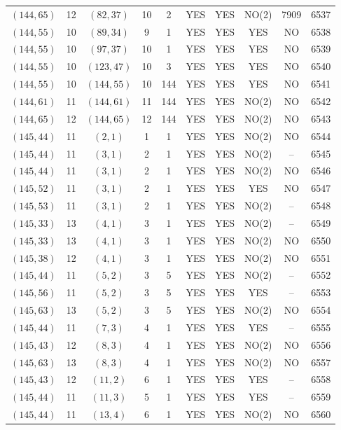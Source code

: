 \begin{longtable}{|c|c|c|c|c|c|c|c|c|c|}
$(144, 65)$ & 12 & $(82, 37)$ & 10 & 2 & YES & YES & NO(2) & 7909 & 6537\\
$(144, 55)$ & 10 & $(89, 34)$ & 9 & 1 & YES & YES & YES & NO & 6538\\
$(144, 55)$ & 10 & $(97, 37)$ & 10 & 1 & YES & YES & YES & NO & 6539\\
$(144, 55)$ & 10 & $(123, 47)$ & 10 & 3 & YES & YES & YES & NO & 6540\\
$(144, 55)$ & 10 & $(144, 55)$ & 10 & 144 & YES & YES & YES & NO & 6541\\
$(144, 61)$ & 11 & $(144, 61)$ & 11 & 144 & YES & YES & NO(2) & NO & 6542\\
$(144, 65)$ & 12 & $(144, 65)$ & 12 & 144 & YES & YES & NO(2) & NO & 6543\\
$(145, 44)$ & 11 & $(2, 1)$ & 1 & 1 & YES & YES & NO(2) & NO & 6544\\
$(145, 44)$ & 11 & $(3, 1)$ & 2 & 1 & YES & YES & NO(2) & -- & 6545\\
$(145, 44)$ & 11 & $(3, 1)$ & 2 & 1 & YES & YES & NO(2) & NO & 6546\\
$(145, 52)$ & 11 & $(3, 1)$ & 2 & 1 & YES & YES & YES & NO & 6547\\
$(145, 53)$ & 11 & $(3, 1)$ & 2 & 1 & YES & YES & NO(2) & -- & 6548\\
$(145, 33)$ & 13 & $(4, 1)$ & 3 & 1 & YES & YES & NO(2) & -- & 6549\\
$(145, 33)$ & 13 & $(4, 1)$ & 3 & 1 & YES & YES & NO(2) & NO & 6550\\
$(145, 38)$ & 12 & $(4, 1)$ & 3 & 1 & YES & YES & NO(2) & NO & 6551\\
$(145, 44)$ & 11 & $(5, 2)$ & 3 & 5 & YES & YES & NO(2) & -- & 6552\\
$(145, 56)$ & 11 & $(5, 2)$ & 3 & 5 & YES & YES & YES & -- & 6553\\
$(145, 63)$ & 13 & $(5, 2)$ & 3 & 5 & YES & YES & NO(2) & NO & 6554\\
$(145, 44)$ & 11 & $(7, 3)$ & 4 & 1 & YES & YES & YES & -- & 6555\\
$(145, 43)$ & 12 & $(8, 3)$ & 4 & 1 & YES & YES & NO(2) & NO & 6556\\
$(145, 63)$ & 13 & $(8, 3)$ & 4 & 1 & YES & YES & NO(2) & NO & 6557\\
$(145, 43)$ & 12 & $(11, 2)$ & 6 & 1 & YES & YES & YES & -- & 6558\\
$(145, 44)$ & 11 & $(11, 3)$ & 5 & 1 & YES & YES & YES & -- & 6559\\
$(145, 44)$ & 11 & $(13, 4)$ & 6 & 1 & YES & YES & NO(2) & NO & 6560\\

\end{longtable}
